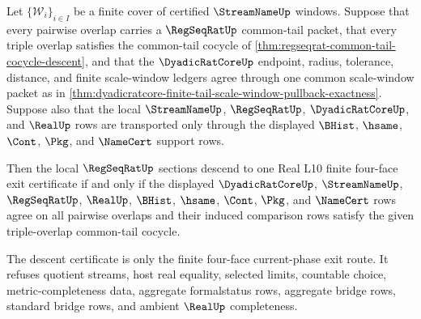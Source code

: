 \begin{theorem}
\label{thm:real-l10-finite-cover-dyadic-common-tail-cocycle-descent}
Let $\{\mathcal{W}_i\}_{i\in I}$ be a finite cover of certified $\StreamNameUp$ windows. Suppose that every pairwise overlap carries a $\RegSeqRatUp$ common-tail packet, that every triple overlap satisfies the common-tail cocycle of \autoref{thm:regseqrat-common-tail-cocycle-descent}, and that the $\DyadicRatCoreUp$ endpoint, radius, tolerance, distance, and finite scale-window ledgers agree through one common scale-window packet as in \autoref{thm:dyadicratcore-finite-tail-scale-window-pullback-exactness}. Suppose also that the local $\StreamNameUp$, $\RegSeqRatUp$, $\DyadicRatCoreUp$, and $\RealUp$ rows are transported only through the displayed $\BHist$, $\hsame$, $\Cont$, $\Pkg$, and $\NameCert$ support rows.

Then the local $\RegSeqRatUp$ sections descend to one Real L10 finite four-face exit certificate if and only if the displayed $\DyadicRatCoreUp$, $\StreamNameUp$, $\RegSeqRatUp$, $\RealUp$, $\BHist$, $\hsame$, $\Cont$, $\Pkg$, and $\NameCert$ rows agree on all pairwise overlaps and their induced comparison rows satisfy the given triple-overlap common-tail cocycle.

The descent certificate is only the finite four-face current-phase exit route. It refuses quotient streams, host real equality, selected limits, countable choice, metric-completeness data, aggregate formalstatus rows, aggregate bridge rows, standard bridge rows, and ambient $\RealUp$ completeness.
\end{theorem}

